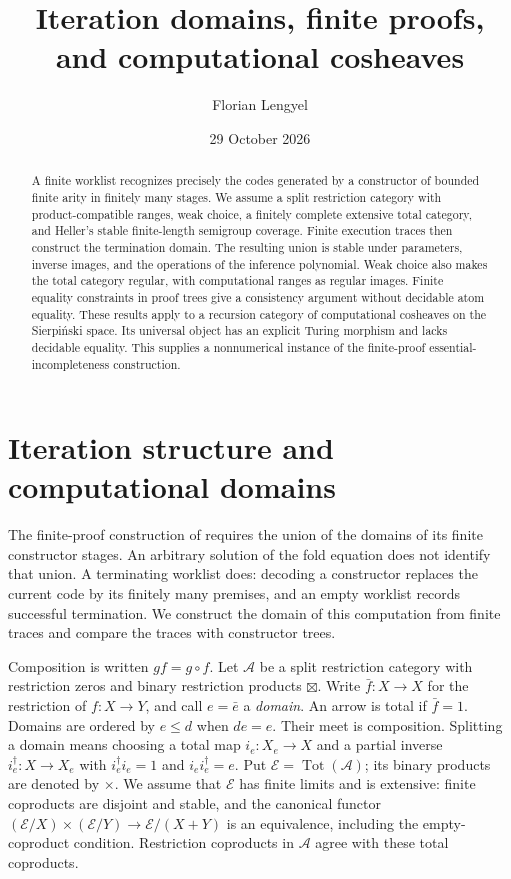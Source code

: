 \documentclass[11pt]{article}
\title{Iteration domains, finite proofs,\\and computational cosheaves}
\author{Florian Lengyel}
\date{29 October 2026}
\theoremstyle{definition}\newtheorem{definition}[theorem]{Definition}
\theoremstyle{remark}\newtheorem{remark}[theorem]{Remark}
\newcommand{\A}{\mathscr A}
\newcommand{\E}{\mathscr E}
\newcommand{\Tot}{\operatorname{Tot}}
\begin{document}
\maketitle
\begin{abstract}
A finite worklist recognizes precisely the codes generated by a constructor
of bounded finite arity in finitely many stages. We assume a split restriction
category with product-compatible ranges, weak choice, a finitely complete
extensive total category, and Heller's stable finite-length semigroup
coverage. Finite execution traces then construct the termination domain.
The resulting union is stable
under parameters, inverse images, and the operations of the inference
polynomial. Weak choice also makes the total category regular, with
computational ranges as regular images. Finite equality constraints in
proof trees give a consistency argument without decidable atom equality.
These results apply to a recursion category of computational cosheaves on
the Sierpi\'nski space. Its universal object has an explicit Turing
morphism and lacks decidable equality. This supplies a nonnumerical
instance of the finite-proof essential-incompleteness construction.
\end{abstract}
\tableofcontents

\section{Iteration structure and computational domains}\label{sec:structure}

The finite-proof construction of \cite{FiniteProofs} requires the union
of the domains of its finite constructor stages. An arbitrary solution
of the fold equation does not identify that union. A terminating
worklist does: decoding a constructor replaces the current code by its
finitely many premises, and an empty worklist records successful
termination. We construct the domain of this computation from finite
traces and compare the traces with constructor trees.

Composition is written $gf=g\circ f$. Let $\A$ be a split restriction
category with restriction zeros and binary restriction products
$\boxtimes$. Write $\bar f:X\to X$ for the restriction of
$f:X\to Y$, and call $e=\bar e$ a \emph{domain}. An arrow is total
if $\bar f=1$. Domains are ordered by $e\le d$ when $de=e$.
Their meet is composition. Splitting a domain means choosing a total
map $i_e:X_e\to X$ and a partial inverse $i_e^\dagger:X\to X_e$
with $i_e^\dagger i_e=1$ and $i_ei_e^\dagger=e$.
Put $\E=\Tot(\A)$; its binary products are denoted by $\times$.
We assume that $\E$ has finite limits and is extensive: finite
coproducts are disjoint and stable, and the canonical functor
$(\E/X)\times(\E/Y)\to\E/(X+Y)$ is an equivalence, including
the empty-coproduct condition. Restriction coproducts in $\A$ agree
with these total coproducts.
\end{document}
